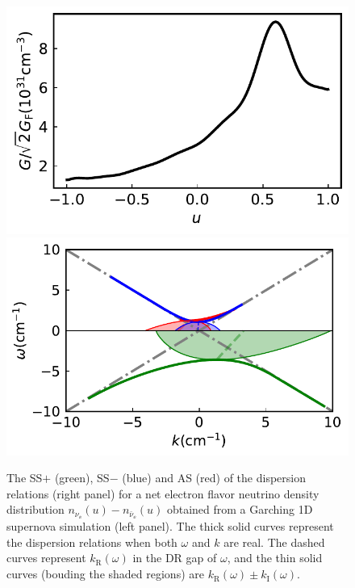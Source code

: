 \begin{figure}
     \includegraphics[width=\linewidth]{chapters/assets/dr/spectGarchingPlt.pdf}
   \endminipage\hfill
   \includegraphics[width=\linewidth]{chapters/assets/dr/spectGarchingDRLSAPltBlob.pdf}
   \endminipage\hfill
   \caption{The SS$+$ (green), SS$-$ (blue) and AS (red) of the dispersion relations (right panel) for a net electron flavor neutrino density distribution $n_{\nu_{\ee}}(u) -n_{\bar\nu_\ee}(u)$ obtained from a Garching 1D supernova simulation (left panel). The thick solid curves represent the dispersion relations when both $\omega$ and $k$ are real. The dashed curves represent $k_{\mathrm R}(\omega)$ in the DR gap of $\omega$, and the thin solid curves (bouding the shaded regions) are $k_{\mathrm R}(\omega)\pm k_{\mathrm I}(\omega)$.}
   \label{fig-garching}
\end{figure}









